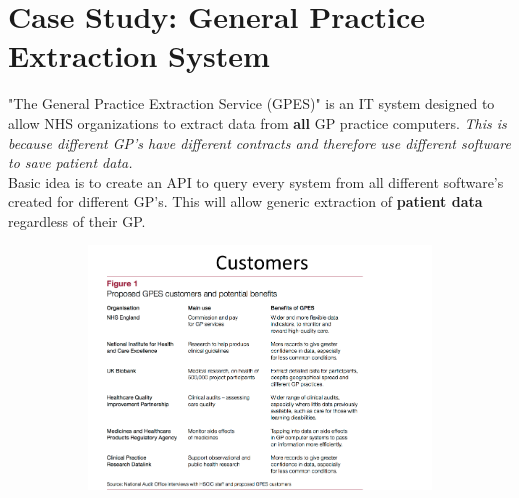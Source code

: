 \documentclass[a4paper]{report}
\begin{document}
\section{Case Study: General Practice Extraction System}

"The General Practice Extraction Service (GPES)" is an IT system designed to allow NHS organizations to extract data from \textbf{all} GP practice computers. \textit{This is because different GP's have different contracts and therefore use different software to save patient data.}\\

Basic idea is to create an API to query every system from all different software's created for different GP's. This will allow generic extraction of \textbf{patient data} regardless of their GP.

\begin{figure}[H]
\centering
\begin{subfigure}{1\textwidth}
  \includegraphics[width=1\linewidth]
  {images/1-customers.png}
\end{subfigure}
\end{figure}
\end{document}
